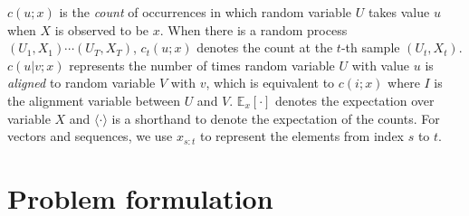 \documentclass[journal]{IEEEtran}
\begin{document}
$c(u; x)$ is the \textit{count} of occurrences in which random variable $U$ takes value $u$ when $X$ is observed to be $x$. When there is a random process $(U_1, X_1) \cdots (U_T, X_T)$, $c_t(u; x)$ denotes the count at the $t$-th sample $(U_t, X_t)$. $c(u|v; x)$ represents the number of times random variable $U$ with value $u$ is \textit{aligned} to random variable $V$ with $v$, which is equivalent to $c(i; x)$ where $I$ is the alignment variable between $U$ and $V$. $\mathbb E_x[\cdot]$ denotes the expectation over variable $X$ and $\langle \cdot \rangle$ is a shorthand to denote the expectation of the counts. For vectors and sequences, we use $x_{s:t}$ to represent the elements from index $s$ to $t$. 

\section{Problem formulation}
\end{document}
